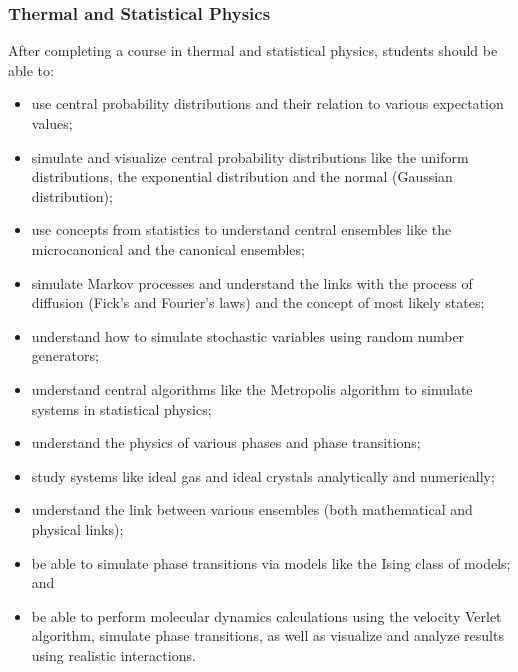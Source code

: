 \documentclass[graybox,envcountchap,sectrefs]{svmult}
\begin{document}
\subsubsection{Thermal and Statistical Physics}
After completing a course in thermal and statistical physics, students should be able to:
\begin{itemize}
\item use central probability distributions and their relation to various expectation values;

\item simulate and visualize central probability distributions like the uniform distributions, the exponential distribution and the normal (Gaussian distribution);

\item use concepts from statistics to understand central ensembles like the microcanonical and the canonical ensembles;

\item simulate Markov processes and understand the links with the process of diffusion (Fick's and Fourier's laws) and the concept of most likely states;

\item understand how to simulate stochastic variables using random number generators;

\item understand central algorithms like the Metropolis algorithm to simulate systems in statistical physics;

\item understand the physics of various phases and phase transitions;

\item study systems like ideal gas and ideal crystals analytically and numerically;

\item understand the link between various ensembles (both mathematical and physical links);

\item be able to simulate phase transitions via models like the Ising class of models; and

\item be able to perform molecular dynamics calculations using the velocity Verlet algorithm, simulate phase transitions, as well as visualize and analyze results using realistic interactions.
\end{itemize}
\end{document}
